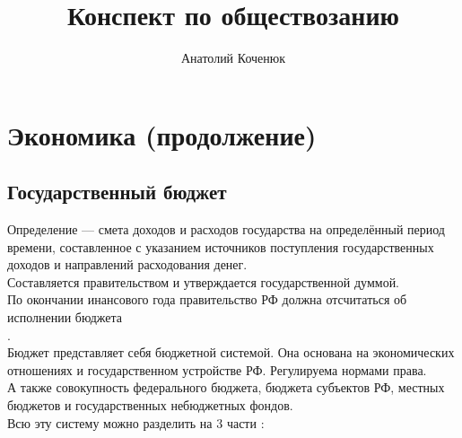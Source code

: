 \documentclass[12pt,a4paper]{book}
\author{Анатолий Коченюк}
\title{Конспект по обществозанию}
\begin{document}
\maketitle 
\newcommand{\hw}{\Huge}
\chapter{Экономика (продолжение)}

\section{Государственный бюджет}
Определение --- смета доходов и расходов государства на определённый период времени, составленное с указанием источников поступления государственных доходов и направлений расходования денег.\\
Составляется правительством и утверждается государственной думмой.\\
По окончании инансового года правительство РФ должна отсчитаться об исполнении бюджета\\.\\
Бюджет представляет себя бюджетной системой. Она основана на экономических отношениях и государственном устройстве РФ. Регулируема нормами права. \\
А также совокупность федерального бюджета, бюджета субъектов РФ, местных бюджетов и государственных небюджетных фондов.\\
Всю эту систему можно разделить на 3 части :
\end{document}
